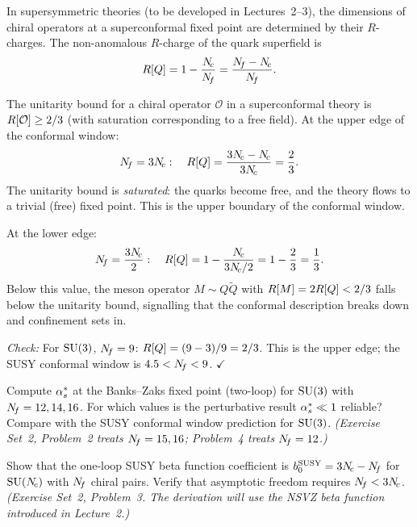 \documentclass[11pt,a4paper]{article}
\begin{document}
In supersymmetric theories (to be developed in Lectures~2--3), the
dimensions of chiral operators at a superconformal fixed point are
determined by their $R$-charges.  The non-anomalous $R$-charge of the
quark superfield is
\begin{equation}
  R[Q] = 1 - \frac{N_{\!c}}{N_{\!f}} = \frac{N_{\!f} - N_{\!c}}{N_{\!f}}.
  \label{eq:r-charge}
\end{equation}

The unitarity bound for a chiral operator $\mathcal{O}$ in a superconformal
theory is $R[\mathcal{O}] \geq 2/3$ (with saturation corresponding
to a free field).  At the upper edge of the conformal window:
\begin{equation}
  N_{\!f} = 3N_{\!c}: \quad
  R[Q] = \frac{3N_{\!c} - N_{\!c}}{3N_{\!c}} = \frac{2}{3}.
  \label{eq:r-charge-upper}
\end{equation}
The unitarity bound is \emph{saturated}: the quarks become free, and the
theory flows to a trivial (free) fixed point.  This is the upper boundary
of the conformal window.

At the lower edge:
\begin{equation}
  N_{\!f} = \frac{3N_{\!c}}{2}: \quad
  R[Q] = 1 - \frac{N_{\!c}}{3N_{\!c}/2} = 1 - \frac{2}{3} = \frac{1}{3}.
  \label{eq:r-charge-lower}
\end{equation}
Below this value, the meson operator $M \sim Q\widetilde{Q}$ with
$R[M] = 2R[Q] < 2/3$ falls below the unitarity bound,
signalling that the conformal description breaks down and confinement sets
in.

\textit{Check:} For $\mathrm{SU}(3)$, $N_{\!f} = 9$: $R[Q] = (9-3)/9 = 2/3$.
This is the upper edge; the SUSY conformal window is $4.5 < N_{\!f} < 9$.
$\checkmark$

\begin{exercise}
  Compute $\alpha_s^*$ at the Banks--Zaks fixed point (two-loop) for
  $\mathrm{SU}(3)$ with $N_{\!f} = 12, 14, 16$.  For which values is the
  perturbative result $\alpha_s^* \ll 1$ reliable?  Compare with the
  SUSY conformal window prediction for $\mathrm{SU}(3)$.
  \textit{(Exercise Set~2, Problem~2 treats $N_{\!f} = 15, 16$; Problem~4
  treats $N_{\!f} = 12$.)}
\end{exercise}

\begin{exercise}
  Show that the one-loop SUSY beta function coefficient is
  $b_0^{\text{SUSY}} = 3N_{\!c} - N_{\!f}$ for $\mathrm{SU}(N_{\!c})$ with $N_{\!f}$ chiral
  pairs.  Verify that asymptotic freedom requires $N_{\!f} < 3N_{\!c}$.
  \textit{(Exercise Set~2, Problem~3.  The derivation will use the NSVZ
  beta function introduced in Lecture~2.)}
\end{exercise}
\end{document}
